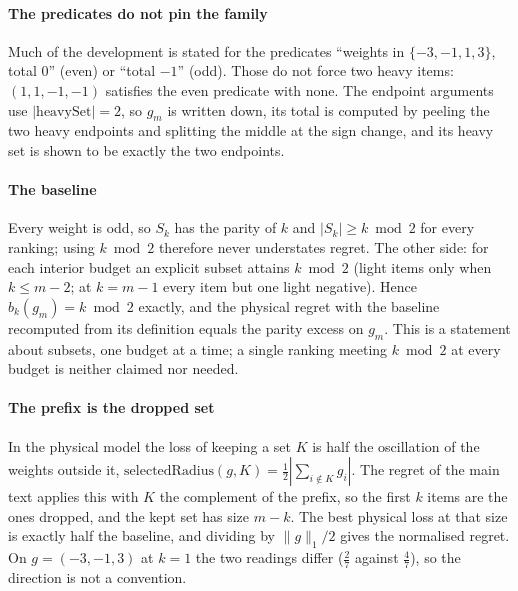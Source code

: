 \paragraph{The predicates do not pin the family} Much of the development is stated for the
predicates ``weights in $\{-3,-1,1,3\}$, total $0$'' (even) or ``total $-1$'' (odd). Those
do not force two heavy items: $(1,1,-1,-1)$ satisfies the even predicate with none. The
endpoint arguments use $|\mathrm{heavySet}|=2$, so $g_{m}$ is written down, its total is
computed by peeling the two heavy endpoints and splitting the middle at the sign change, and
its heavy set is shown to be exactly the two endpoints.


\paragraph{The baseline} Every weight is odd, so $S_{k}$ has the parity of $k$ and
$|S_{k}|\ge k\bmod2$ for every ranking; using $k\bmod2$ therefore never understates regret.
The other side: for each interior budget an explicit subset attains $k\bmod2$ (light items
only when $k\le m-2$; at $k=m-1$ every item but one light negative). Hence
$b_{k}(g_{m})=k\bmod2$ exactly, and the physical regret with the baseline recomputed from
its definition equals the parity excess on $g_{m}$. This is a statement about subsets, one
budget at a time; a single ranking meeting $k\bmod2$ at every budget is neither claimed nor
needed.


\paragraph{The prefix is the dropped set} In the physical model the loss of keeping a set $K$
is half the oscillation of the weights outside it,
$\mathrm{selectedRadius}(g,K)=\tfrac12|\sum_{i\notin K}g_{i}|$. The regret of the main
text applies this with $K$ the complement of the prefix, so the first $k$ items are the ones
dropped, and the kept set has size $m-k$. The best physical loss at that size is exactly
half the baseline, and dividing by $\|g\|_{1}/2$ gives the normalised regret. On
$g=(-3,-1,3)$ at $k=1$ the two readings differ ($\tfrac27$ against $\tfrac47$), so the
direction is not a convention.

